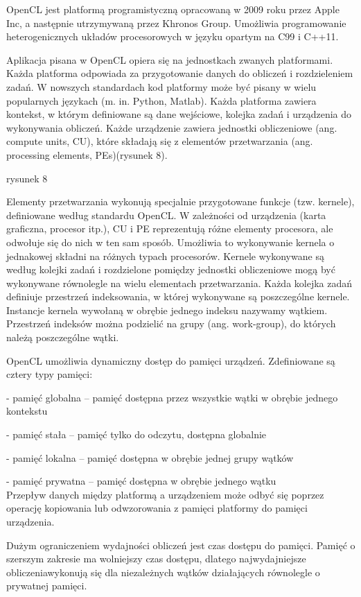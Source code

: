 OpenCL jest platformą programistyczną opracowaną w 2009 roku przez Apple Inc, a następnie utrzymywaną przez Khronos Group. Umożliwia programowanie heterogenicznych układów procesorowych w języku opartym na C99 i C++11.


Aplikacja pisana w OpenCL opiera się na jednostkach zwanych platformami. Każda platforma odpowiada za przygotowanie danych do obliczeń i rozdzieleniem zadań. W nowszych standardach kod platformy może być pisany w wielu popularnych językach  (m. in. Python, Matlab). Każda platforma zawiera kontekst, w którym definiowane są dane wejściowe, kolejka zadań i urządzenia do wykonywania obliczeń. Każde urządzenie zawiera jednostki obliczeniowe (ang. compute units, CU), które składają się z elementów przetwarzania (ang. processing elements, PEs)(rysunek 8). 

rysunek 8

Elementy przetwarzania wykonują specjalnie przygotowane funkcje (tzw. kernele), definiowane według standardu OpenCL. W zależności od urządzenia (karta graficzna, procesor itp.), CU i PE reprezentują różne elementy procesora, ale odwołuje się do nich w ten sam sposób. Umożliwia to wykonywanie  kernela o jednakowej składni na różnych typach procesorów. Kernele wykonywane są według kolejki zadań i rozdzielone pomiędzy jednostki obliczeniowe mogą być wykonywane równolegle na wielu elementach przetwarzania. Każda kolejka zadań definiuje przestrzeń indeksowania, w której wykonywane są poszczególne kernele.  Instancje kernela wywołaną w obrębie jednego indeksu nazywamy wątkiem. Przestrzeń indeksów można podzielić na grupy (ang. work-group), do których należą poszczególne wątki.


OpenCL umożliwia dynamiczny dostęp do pamięci urządzeń. Zdefiniowane są cztery typy pamięci:

- pamięć globalna – pamięć dostępna przez wszystkie wątki w obrębie jednego kontekstu

- pamięć stała – pamięć tylko do odczytu, dostępna globalnie

- pamięć lokalna – pamięć dostępna w obrębie jednej grupy wątków

- pamięć prywatna – pamięć dostępna w obrębie jednego wątku\\


 Przepływ danych między platformą  a urządzeniem może odbyć się poprzez operację kopiowania  lub odwzorowania z pamięci platformy do pamięci urządzenia.


Dużym ograniczeniem wydajności obliczeń jest czas dostępu do pamięci. Pamięć o szerszym zakresie ma wolniejszy czas dostępu, dlatego najwydajniejsze obliczeniawykonują się dla niezależnych wątków działających równolegle o prywatnej pamięci.















